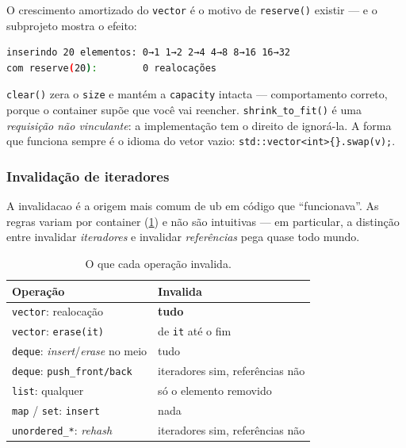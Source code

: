 O crescimento amortizado do \texttt{vector} é o motivo de \texttt{reserve()}
existir --- e o subprojeto mostra o efeito:

\begin{lstlisting}[style=bt, language=bash,
    caption={Saída de \texttt{src/stl/}: o mesmo laço, com e sem \texttt{reserve}.}]
inserindo 20 elementos: 0→1 1→2 2→4 4→8 8→16 16→32
com reserve(20):        0 realocações
\end{lstlisting}

\begin{armadilha}
\texttt{clear()} zera o \texttt{size} e mantém a \texttt{capacity} intacta ---
comportamento correto, porque o container supõe que você vai reencher.
\texttt{shrink\_to\_fit()} é uma \emph{requisição não vinculante}: a
implementação tem o direito de ignorá-la. A forma que funciona sempre é o
idioma do vetor vazio: \texttt{std::vector<int>\{\}.swap(v);}.
\end{armadilha}

\subsubsection{Invalidação de iteradores}

A \gls{invalidacao} é a origem mais comum de \gls{ub} em código que
``funcionava''. As regras variam por container (\cref{tab:invalidacao}) e não
são intuitivas --- em particular, a distinção entre invalidar \emph{iteradores}
e invalidar \emph{referências} pega quase todo mundo.

\begin{table}[htbp]
\centering
\caption{O que cada operação invalida.}
\label{tab:invalidacao}
\footnotesize
\begin{tabular}{@{}ll@{}}
\toprule
\textbf{Operação} & \textbf{Invalida} \\
\midrule
\texttt{vector}: realocação                  & \textbf{tudo} \\
\texttt{vector}: \texttt{erase(it)}          & de \texttt{it} até o fim \\
\texttt{deque}: \emph{insert}/\emph{erase} no meio & tudo \\
\texttt{deque}: \texttt{push\_front/back}    & iteradores sim, referências não \\
\texttt{list}: qualquer                      & só o elemento removido \\
\texttt{map} / \texttt{set}: \texttt{insert} & nada \\
\texttt{unordered\_*}: \emph{rehash}         & iteradores sim, referências não \\
\bottomrule
\end{tabular}
\end{table}

